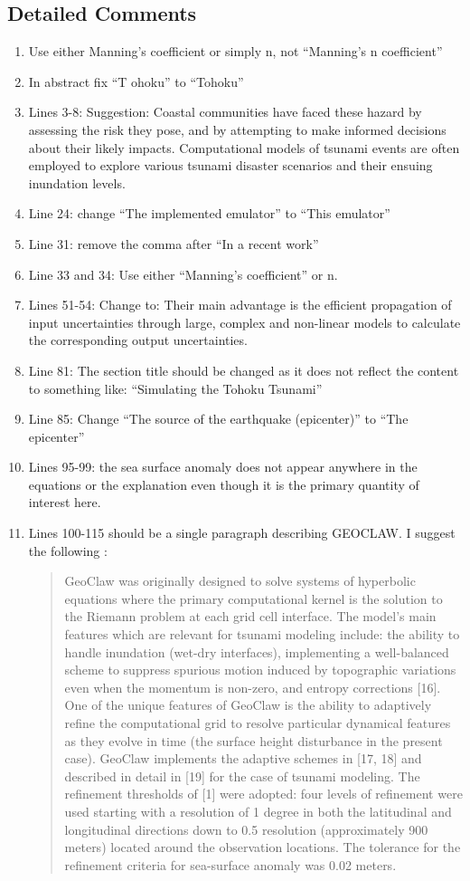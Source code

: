 \documentclass[]{article}
\begin{document}
\subsection*{Detailed Comments}
\begin{enumerate}
\item Use either Manning’s coefficient or simply n, not “Manning’s n coefficient”
\item In abstract fix “T ohoku” to “Tohoku”
\item Lines 3-8: Suggestion: Coastal communities have faced these hazard by assessing the risk they pose, and by attempting to make informed decisions about their likely impacts. Computational models of tsunami events are often employed to explore various tsunami disaster scenarios and their ensuing inundation levels.
\item Line 24: change “The implemented emulator” to “This emulator”
\item Line 31: remove the comma after “In a recent work”
\item Line 33 and 34: Use either “Manning’s coefficient” or n.
\item Lines 51-54: Change to: Their main advantage is the efficient propagation of input uncertainties through large, complex and non-linear models to calculate the corresponding output uncertainties.
\item Line 81: The section title should be changed as it does not reflect the content to something like:  “Simulating the Tohoku Tsunami”
\item Line 85: Change “The source of the earthquake (epicenter)” to “The epicenter”
\item Lines 95-99: the sea surface anomaly does not appear anywhere in the equations or the explanation even though it is the primary quantity of interest here.
\item Lines 100-115 should be a single paragraph describing GEOCLAW. I suggest the following :
\begin{quote}
GeoClaw was originally designed to solve systems of hyperbolic equations where the primary computational kernel is the solution to the Riemann problem at each grid cell interface. The model’s main features which are relevant for tsunami modeling include: the ability to handle inundation (wet-dry interfaces), implementing a well-balanced scheme to suppress spurious motion induced by topographic variations even when the momentum is non-zero, and entropy corrections [16]. One of the unique features of GeoClaw is the ability to adaptively refine the computational grid to resolve particular dynamical features as they evolve in time (the surface height disturbance in the present case). GeoClaw implements the adaptive schemes in [17, 18] and described in detail in [19] for the case of tsunami modeling. The refinement thresholds of [1] were adopted: four levels of refinement were used starting with a resolution of 1 degree in both the latitudinal and longitudinal directions down to 0.5 resolution (approximately 900 meters) located around the observation locations. The tolerance for the refinement criteria for sea-surface anomaly was 0.02 meters.  

\end{quote}
\end{enumerate}
\end{document}

